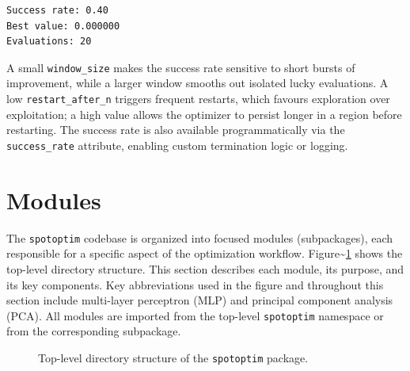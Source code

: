\documentclass[
  twocolumn]{article}
\begin{document}
\begin{verbatim}
Success rate: 0.40
Best value: 0.000000
Evaluations: 20
\end{verbatim}

A small \texttt{window\_size} makes the success rate sensitive to short
bursts of improvement, while a larger window smooths out isolated lucky
evaluations. A low \texttt{restart\_after\_n} triggers frequent
restarts, which favours exploration over exploitation; a high value
allows the optimizer to persist longer in a region before restarting.
The success rate is also available programmatically via the
\texttt{success\_rate} attribute, enabling custom termination logic or
logging.

\section{Modules}\label{sec-modules}

The \texttt{spotoptim} codebase is organized into focused modules
(subpackages), each responsible for a specific aspect of the
optimization workflow. Figure\textasciitilde{}\ref{fig-dirtree} shows
the top-level directory structure. This section describes each module,
its purpose, and its key components. Key abbreviations used in the
figure and throughout this section include multi-layer perceptron (MLP)
and principal component analysis (PCA). All modules are imported from
the top-level \texttt{spotoptim} namespace or from the corresponding
subpackage.

\begin{figure}[ht]
\caption{Top-level directory structure of the \texttt{spotoptim} package.}\label{fig-dirtree}
\end{figure}
\end{document}
